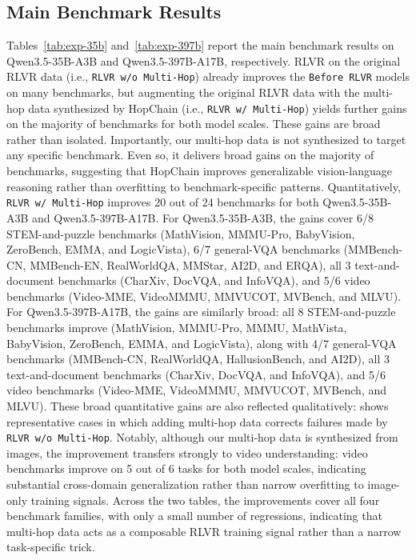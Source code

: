 \subsection{Main Benchmark Results}
\label{sec:exp-main-results}
Tables~\ref{tab:exp-35b} and~\ref{tab:exp-397b} report the main benchmark results on Qwen3.5-35B-A3B and Qwen3.5-397B-A17B, respectively.
RLVR on the original RLVR data (i.e., \texttt{RLVR w/o Multi-Hop}) already improves the \texttt{Before RLVR} models on many benchmarks, but augmenting the original RLVR data with the multi-hop data synthesized by HopChain (i.e., \texttt{RLVR w/ Multi-Hop}) yields further gains on the majority of benchmarks for both model scales.
These gains are broad rather than isolated.
Importantly, our multi-hop data is not synthesized to target any specific benchmark. Even so, it delivers broad gains on the majority of benchmarks, suggesting that HopChain improves generalizable vision-language reasoning rather than overfitting to benchmark-specific patterns.
Quantitatively, \texttt{RLVR w/ Multi-Hop} improves 20 out of 24 benchmarks for both Qwen3.5-35B-A3B and Qwen3.5-397B-A17B.
For Qwen3.5-35B-A3B, the gains cover 6/8 STEM-and-puzzle benchmarks (MathVision, MMMU-Pro, BabyVision, ZeroBench, EMMA, and LogicVista), 6/7 general-VQA benchmarks (MMBench-CN, MMBench-EN, RealWorldQA, MMStar, AI2D, and ERQA), all 3 text-and-document benchmarks (CharXiv, DocVQA, and InfoVQA), and 5/6 video benchmarks (Video-MME, VideoMMMU, MMVUCOT, MVBench, and MLVU).
For Qwen3.5-397B-A17B, the gains are similarly broad: all 8 STEM-and-puzzle benchmarks improve (MathVision, MMMU-Pro, MMMU, MathVista, BabyVision, ZeroBench, EMMA, and LogicVista), along with 4/7 general-VQA benchmarks (MMBench-CN, RealWorldQA, HallusionBench, and AI2D), all 3 text-and-document benchmarks (CharXiv, DocVQA, and InfoVQA), and 5/6 video benchmarks (Video-MME, VideoMMMU, MMVUCOT, MVBench, and MLVU).
These broad quantitative gains are also reflected qualitatively:  shows representative cases in which adding multi-hop data corrects failures made by \texttt{RLVR w/o Multi-Hop}.
Notably, although our multi-hop data is synthesized from images, the improvement transfers strongly to video understanding: video benchmarks improve on 5 out of 6 tasks for both model scales, indicating substantial cross-domain generalization rather than narrow overfitting to image-only training signals.
Across the two tables, the improvements cover all four benchmark families, with only a small number of regressions, indicating that multi-hop data acts as a composable RLVR training signal rather than a narrow task-specific trick.






